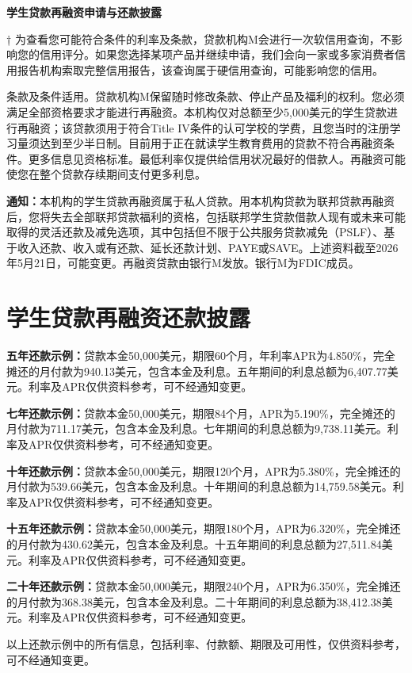 \documentclass[UTF8,fontset=none,11pt,a4paper]{ctexart}
\begin{document}
{\noindent\fontsize{20}{25}\selectfont\bfseries 学生贷款再融资申请与还款披露\par}
\vspace{10pt}
† 为查看您可能符合条件的利率及条款，贷款机构M会进行一次软信用查询，不影响您的信用评分。如果您选择某项产品并继续申请，我们会向一家或多家消费者信用报告机构索取完整信用报告，该查询属于硬信用查询，可能影响您的信用。


条款及条件适用。贷款机构M保留随时修改条款、停止产品及福利的权利。您必须满足全部资格要求才能进行再融资。本机构仅对总额至少5,000美元的学生贷款进行再融资；该贷款须用于符合Title IV条件的认可学校的学费，且您当时的注册学习量须达到至少半日制。目前用于正在就读学生教育费用的贷款不符合再融资条件。更多信息见资格标准。最低利率仅提供给信用状况最好的借款人。再融资可能使您在整个贷款存续期间支付更多利息。


\textbf{通知：}本机构的学生贷款再融资属于私人贷款。用本机构贷款为联邦贷款再融资后，您将失去全部联邦贷款福利的资格，包括联邦学生贷款借款人现有或未来可能取得的灵活还款及减免选项，其中包括但不限于公共服务贷款减免（PSLF）、基于收入还款、收入或有还款、延长还款计划、PAYE或SAVE。上述资料截至2026年5月21日，可能变更。再融资贷款由银行M发放。银行M为FDIC成员。


\section*{学生贷款再融资还款披露}
\textbf{五年还款示例：}贷款本金50,000美元，期限60个月，年利率APR为4.850\%，完全摊还的月付款为940.13美元，包含本金及利息。五年期间的利息总额为6,407.77美元。利率及APR仅供资料参考，可不经通知变更。


\textbf{七年还款示例：}贷款本金50,000美元，期限84个月，APR为5.190\%，完全摊还的月付款为711.17美元，包含本金及利息。七年期间的利息总额为9,738.11美元。利率及APR仅供资料参考，可不经通知变更。


\textbf{十年还款示例：}贷款本金50,000美元，期限120个月，APR为5.380\%，完全摊还的月付款为539.66美元，包含本金及利息。十年期间的利息总额为14,759.58美元。利率及APR仅供资料参考，可不经通知变更。


\textbf{十五年还款示例：}贷款本金50,000美元，期限180个月，APR为6.320\%，完全摊还的月付款为430.62美元，包含本金及利息。十五年期间的利息总额为27,511.84美元。利率及APR仅供资料参考，可不经通知变更。


\textbf{二十年还款示例：}贷款本金50,000美元，期限240个月，APR为6.350\%，完全摊还的月付款为368.38美元，包含本金及利息。二十年期间的利息总额为38,412.38美元。利率及APR仅供资料参考，可不经通知变更。


以上还款示例中的所有信息，包括利率、付款额、期限及可用性，仅供资料参考，可不经通知变更。
\end{document}
